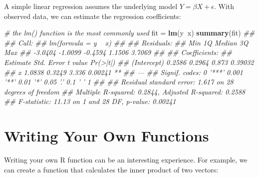 \documentclass[
]{article}
\newenvironment{Shaded}{\begin{snugshade}}{\end{snugshade}}
\newcommand{\CommentTok}[1]{\textcolor[rgb]{0.56,0.35,0.01}{\textit{#1}}}
\newcommand{\ControlFlowTok}[1]{\textcolor[rgb]{0.13,0.29,0.53}{\textbf{#1}}}
\newcommand{\DecValTok}[1]{\textcolor[rgb]{0.00,0.00,0.81}{#1}}
\newcommand{\KeywordTok}[1]{\textcolor[rgb]{0.13,0.29,0.53}{\textbf{#1}}}
\newcommand{\NormalTok}[1]{#1}
\newcommand{\OperatorTok}[1]{\textcolor[rgb]{0.81,0.36,0.00}{\textbf{#1}}}
\newcommand{\StringTok}[1]{\textcolor[rgb]{0.31,0.60,0.02}{#1}}
\begin{document}
A simple linear regression assumes the underlying model
\(Y = \beta X + \epsilon\). With observed data, we can estimate the
regression coefficients:

\begin{Shaded}
\begin{Highlighting}[]
    \CommentTok{# the lm() function is the most commonly used}
\NormalTok{    fit =}\StringTok{ }\KeywordTok{lm}\NormalTok{(y}\OperatorTok{~}\NormalTok{x)}
    \KeywordTok{summary}\NormalTok{(fit)}
\CommentTok{## }
\CommentTok{## Call:}
\CommentTok{## lm(formula = y ~ x)}
\CommentTok{## }
\CommentTok{## Residuals:}
\CommentTok{##     Min      1Q  Median      3Q     Max }
\CommentTok{## -3.0404 -1.0099 -0.4594  1.1506  3.7069 }
\CommentTok{## }
\CommentTok{## Coefficients:}
\CommentTok{##             Estimate Std. Error t value Pr(>|t|)   }
\CommentTok{## (Intercept)   0.2586     0.2964   0.873  0.39032   }
\CommentTok{## x             1.0838     0.3249   3.336  0.00241 **}
\CommentTok{## ---}
\CommentTok{## Signif. codes:  0 '***' 0.001 '**' 0.01 '*' 0.05 '.' 0.1 ' ' 1}
\CommentTok{## }
\CommentTok{## Residual standard error: 1.617 on 28 degrees of freedom}
\CommentTok{## Multiple R-squared:  0.2844, Adjusted R-squared:  0.2588 }
\CommentTok{## F-statistic: 11.13 on 1 and 28 DF,  p-value: 0.00241}
\end{Highlighting}
\end{Shaded}

\hypertarget{writing-your-own-functions}{%
\section{Writing Your Own Functions}\label{writing-your-own-functions}}

Writing your own R function can be an interesting experience. For
example, we can create a function that calculates the inner product of
two vectors:

\begin{Shaded}
\end{Shaded}
\end{document}
